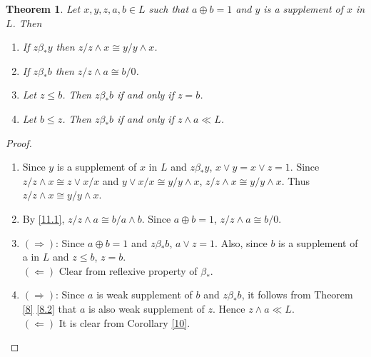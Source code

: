 \documentclass[a4paper,12pt]{article}
\newtheorem{theorem}{Theorem}[section]
\numberwithin{equation}{section}
\begin{document}
\begin{theorem}\label{11}
  Let $ x,y,z,a,b \in L $ such that $ a \oplus b = 1 $ and $ y $ is a supplement of $ x $ in $ L $. Then
  \begin{enumerate}[label=(\roman{*}), ref=(\roman{*})]
    \item
      If $ z \beta_* y $ then $ z / z \wedge x \cong y / y \wedge x $. \label{11.1}
    \item
      If $ z \beta_* b $ then $ z / z \wedge a \cong b / 0 $. \label{11.2}
    \item
      Let $ z \leq b $. Then $ z \beta_* b $ if and only if $ z = b $.\label{11.3}
    \item
      Let $ b \leq z $. Then $ z \beta_* b $ if and only if $ z \wedge a \ll L $.\label{11.4}
  \end{enumerate}
\end{theorem}
\begin{proof}
  \begin{enumerate}
    \item
      Since $ y $ is a supplement of $ x $ in $ L $ and $ z \beta_* y $, 
      $ x \vee y = x \vee z = 1 $. Since $ z / z  \wedge x \cong z \vee x / x $ and 
      $ y \vee x / x \cong y / y \wedge x $, $ z / z \wedge x \cong y / y \wedge x $. 
      Thus $ z / z \wedge x \cong y / y \wedge x $.
    \item
      By \ref{11.1}, $ z / z \wedge a \cong b / a \wedge b $. Since $ a \oplus b = 1 $, 
      $ z / z \wedge a \cong b / 0 $.
    \item
      $ ( \Rightarrow ) $: 
      Since $ a \oplus b = 1 $ and $ z \beta_* b $, $ a \vee z = 1 $. Also, since $ b $ is a supplement of 
      a in $ L $ and $ z \leq b $, $ z = b $. \\
      $ ( \Leftarrow ) $ 
      Clear from reflexive property of $ \beta_* $.
    \item
      $ ( \Rightarrow ) $:
      Since $ a $ is weak supplement of $ b $ and $ z \beta_* b $, it follows from 
      Theorem \ref{8} \ref{8.2} that $ a $ is also weak supplement of $ z $. Hence $ z \wedge a \ll L $. \\
      $ ( \Leftarrow ) $ 
      It is clear from Corollary \ref{10}.
  \end{enumerate}
\end{proof}

\end{document}
